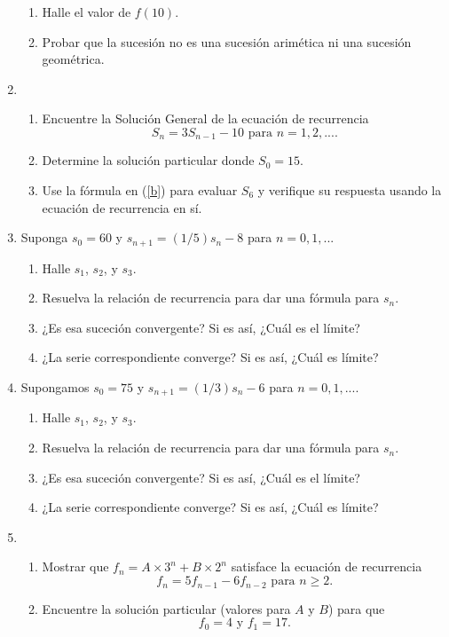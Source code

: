 \documentclass[12pt, a4paper]{book}
\begin{document}
\begin{enumerate}
\begin{enumerate}
        \item Halle el valor de $f(10).$ 
        \item Probar que la sucesión no es una sucesión arimética ni una sucesión geométrica.
    \end{enumerate}
    \item \begin{enumerate}
        \item Encuentre la Solución General de la ecuación de recurrencia $$S_n=3S_{n-1}-10\text{  para }n=1,2,....$$
        \item\label{b} Determine la solución particular donde $S_0=15$.
        \item Use la fórmula en (\ref{b}) para evaluar $S_6$ y verifique su respuesta usando la ecuación de recurrencia en sí.
    \end{enumerate}
    \item Suponga $s_0=60$ y $s_{n+1}=(1/5)s_n-8$ para $n=0,1,...$
    \begin{enumerate}
        \item Halle $s_1$, $s_2$, y $s_3$.
        \item Resuelva la relación de recurrencia para dar una fórmula para $s_n$.
        \item ¿Es esa suceción convergente? Si es así, ¿Cuál es el límite?
        \item ¿La serie correspondiente converge? Si es así, ¿Cuál es límite?
    \end{enumerate}
    \item Supongamos $s_0=75$ y $s_{n+1}=(1/3)s_n - 6$ para $n=0,1, ....$
    \begin{enumerate}
        \item Halle $s_1$, $s_2$, y $s_3$.
         \item Resuelva la relación de recurrencia para dar una fórmula para $s_n$.
        \item ¿Es esa suceción convergente? Si es así, ¿Cuál es el límite?
        \item ¿La serie correspondiente converge? Si es así, ¿Cuál es límite?
    \end{enumerate}
    \item \begin{enumerate}
        \item Mostrar que $f_n=A\times 3^n + B\times 2^n$ satisface la ecuación de recurrencia $$f_n=5f_{n-1}-6f_{n-2}\text{ para } n\geq 2.$$
        \item Encuentre la solución particular (valores para $A$ y $B$) para que $$f_0=4\text{ y }f_1=17.$$

\end{enumerate}
\end{enumerate}
\end{document}
